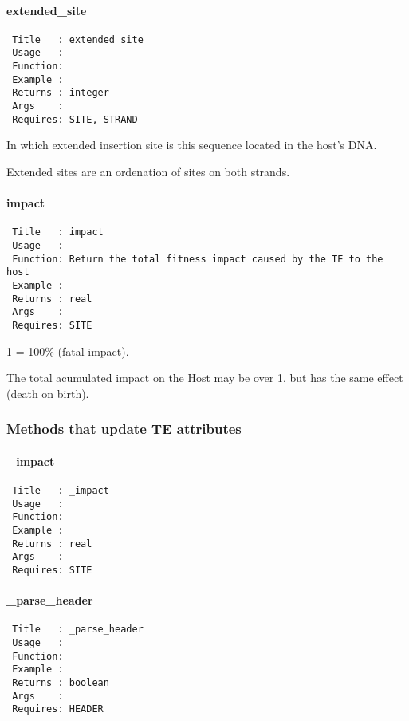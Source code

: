 \paragraph*{extended\_site\label{extended_site}}
\begin{verbatim}
 Title   : extended_site
 Usage   :
 Function: 
 Example :
 Returns : integer
 Args    :
 Requires: SITE, STRAND
\end{verbatim}


In which extended insertion site is this sequence located in the host's DNA.



Extended sites are an ordenation of sites on both strands.

\paragraph*{impact\label{impact}}
\begin{verbatim}
 Title   : impact
 Usage   :
 Function: Return the total fitness impact caused by the TE to the host
 Example :
 Returns : real
 Args    :
 Requires: SITE
\end{verbatim}


1 = 100\% (fatal impact).



The total acumulated impact on the Host may be over 1, but has the
same effect (death on birth).

\subsubsection*{Methods that update TE attributes\label{Methods_that_update_TE_attributes}}
\paragraph*{\_impact\label{_impact}}
\begin{verbatim}
 Title   : _impact
 Usage   : 
 Function: 
 Example : 
 Returns : real
 Args    : 
 Requires: SITE
\end{verbatim}
\paragraph*{\_parse\_header\label{_parse_header}}
\begin{verbatim}
 Title   : _parse_header
 Usage   : 
 Function: 
 Example : 
 Returns : boolean
 Args    : 
 Requires: HEADER
\end{verbatim}
